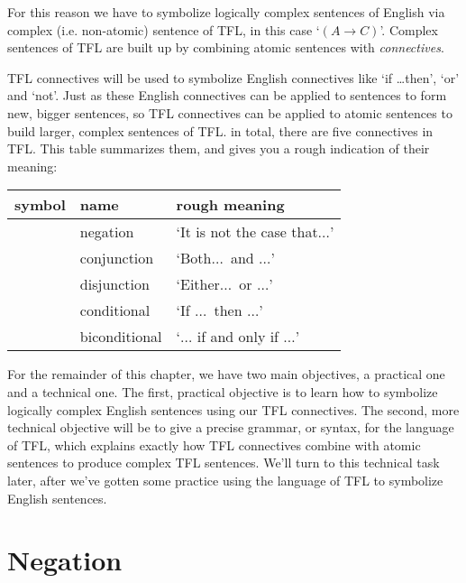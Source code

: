 For this reason we have to symbolize logically complex sentences of English via complex (i.e. non-atomic) sentence of TFL, in this case `$(A \rightarrow C)$'.  Complex sentences of TFL are built up by combining atomic sentences with \emph{connectives}.



TFL connectives will be used to symbolize English connectives like `if \ldots then', `or' and `not'.  Just as these English connectives can be applied to sentences to form new, bigger sentences, so TFL connectives can be applied to atomic sentences to build larger, complex sentences of TFL.  in total, there are five connectives in TFL. This table summarizes them, and gives you a rough indication of their meaning:


	\begin{table}[h]
	\center
	\begin{tabular}{l l l}
	
	\textbf{symbol}&\textbf{name}&\textbf{rough meaning}\\
	\hline
	\enot&negation&`It is not the case that$\ldots$'\\
	\eand&conjunction&`Both$\ldots$\ and $\ldots$'\\
	\eor&disjunction&`Either$\ldots$\ or $\ldots$'\\
	\eif&conditional&`If $\ldots$\ then $\ldots$'\\
	\eiff&biconditional&`$\ldots$ if and only if $\ldots$'\\
	
	\end{tabular}
	\end{table}

For the remainder of this chapter, we have two main objectives, a practical one and a technical one.  The first, practical objective is to learn how to symbolize logically complex English sentences using our TFL connectives.  The second, more technical objective will be to give a precise grammar, or syntax, for the language of TFL, which explains exactly how TFL connectives combine with atomic sentences to produce complex TFL sentences.  We'll turn to this technical task later, after we've gotten some practice using the language of TFL to symbolize English sentences.

\section{Negation}

